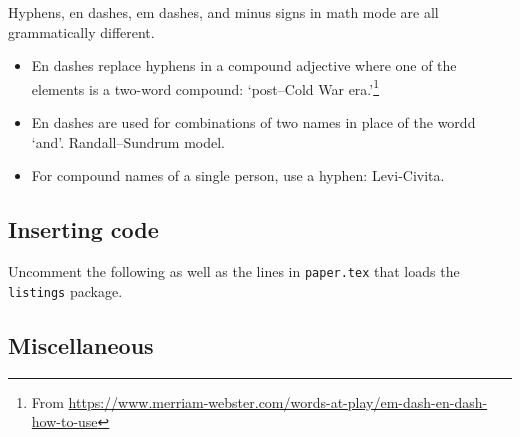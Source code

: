 Hyphens, en dashes, em dashes, and minus signs in math mode are all grammatically different.
\begin{itemize}
	\item En dashes replace hyphens in a compound adjective where one of the elements is a two-word compound: `post--Cold War era.'\footnote{From \url{https://www.merriam-webster.com/words-at-play/em-dash-en-dash-how-to-use}}
	\item En dashes are used for combinations of two names in place of the wordd `and'. Randall--Sundrum model.
	\item For compound names of a single person, use a hyphen: Levi-Civita.
\end{itemize}

\subsection{Inserting code}

Uncomment the following as well as the lines in \texttt{paper.tex} that loads the \texttt{listings} package.
% 



\subsection{Miscellaneous}

